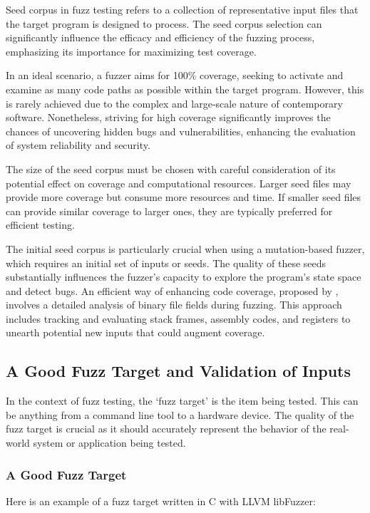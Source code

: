 Seed corpus in fuzz testing refers to a collection of representative input
files that the target program is designed to process. The seed corpus selection
can significantly influence the efficacy and efficiency of the fuzzing process,
emphasizing its importance for maximizing test coverage\cite{herrera2021seed}.

In an ideal scenario, a fuzzer aims for 100\% coverage, seeking to activate and
examine as many code paths as possible within the target program. However, this
is rarely achieved due to the complex and large-scale nature of contemporary
software. Nonetheless, striving for high coverage significantly improves the
chances of uncovering hidden bugs and vulnerabilities, enhancing the evaluation
of system reliability and security\cite{godefroid2012sage}.

The size of the seed corpus must be chosen with careful consideration of
its potential effect on coverage and computational resources. Larger seed files
may provide more coverage but consume more resources and time. If smaller seed
files can provide similar coverage to larger ones, they are typically preferred
for efficient testing\cite{liang2018fuzzing}\cite{jurczyk2016effective}.

The initial seed corpus is particularly crucial when using a mutation-based
fuzzer, which requires an initial set of inputs or seeds. The quality of these
seeds substantially influences the fuzzer's capacity to explore the program's
state space and detect bugs\cite{miller2007analysis}. An efficient way of
enhancing code coverage, proposed by , involves a
detailed analysis of binary file fields during fuzzing. This approach includes
tracking and evaluating stack frames, assembly codes, and registers to unearth
potential new inputs that could augment coverage\cite{kim2011efficient}.

\subsection{A Good Fuzz Target and Validation of Inputs}
In the context of fuzz testing, the `fuzz target' is the item being tested.
This can be anything from a command line tool to a hardware device. The quality
of the fuzz target is crucial as it should accurately represent the behavior of
the real-world system or application being tested\cite{238602}.

\subsubsection{A Good Fuzz Target}
Here is an example of a fuzz target written in C with LLVM libFuzzer\cite{libFuzze17:online}:

